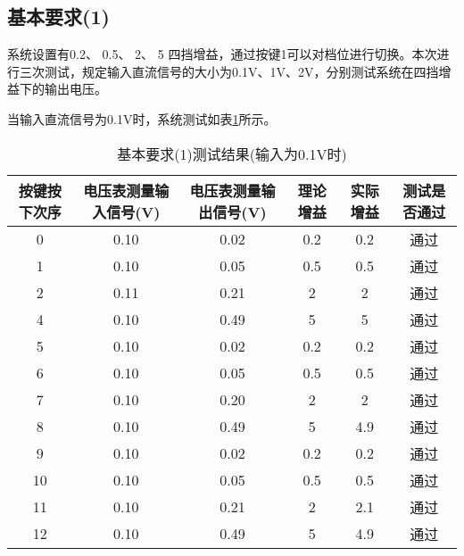 \documentclass[lang=cn,11pt,a4paper]{elegantpaper}
\begin{document}
\subsection{基本要求(1)}
系统设置有0.2、 0.5、 2、 5 四挡增益，通过按键1可以对档位进行切换。本次进行三次测试，规定输入直流信号的大小为0.1V、1V、2V，分别测试系统在四挡增益下的输出电压。

当输入直流信号为0.1V时，系统测试如表\ref{tab:1_0.1V}所示。
\begin{table}[!ht]
  \centering
  \caption{基本要求(1)测试结果(输入为0.1V时)}
  \begin{tabular}{cccccc}
    \textbf{按键按下次序} & \textbf{电压表测量输入信号(V)} & \textbf{电压表测量输出信号(V)} & \textbf{理论增益} & \textbf{实际增益} & \textbf{测试是否通过} \\ \hline
    0               & 0.10                  & 0.02                  & 0.2           & 0.2           & 通过              \\
    1               & 0.10                  & 0.05                  & 0.5           & 0.5           & 通过              \\
    2               & 0.11                  & 0.21                  & 2             & 2             & 通过              \\
    4               & 0.10                  & 0.49                  & 5             & 5             & 通过              \\
    5               & 0.10                  & 0.02                  & 0.2           & 0.2           & 通过              \\
    6               & 0.10                  & 0.05                  & 0.5           & 0.5           & 通过              \\
    7               & 0.10                  & 0.20                  & 2             & 2             & 通过              \\
    8               & 0.10                  & 0.49                  & 5             & 4.9           & 通过              \\
    9               & 0.10                  & 0.02                  & 0.2           & 0.2           & 通过              \\
    10              & 0.10                  & 0.05                  & 0.5           & 0.5           & 通过              \\
    11              & 0.10                  & 0.21                  & 2             & 2.1           & 通过              \\
    12              & 0.10                  & 0.49                  & 5             & 4.9           & 通过              \\
  \end{tabular}
  \label{tab:1_0.1V}
\end{table}
\end{document}
